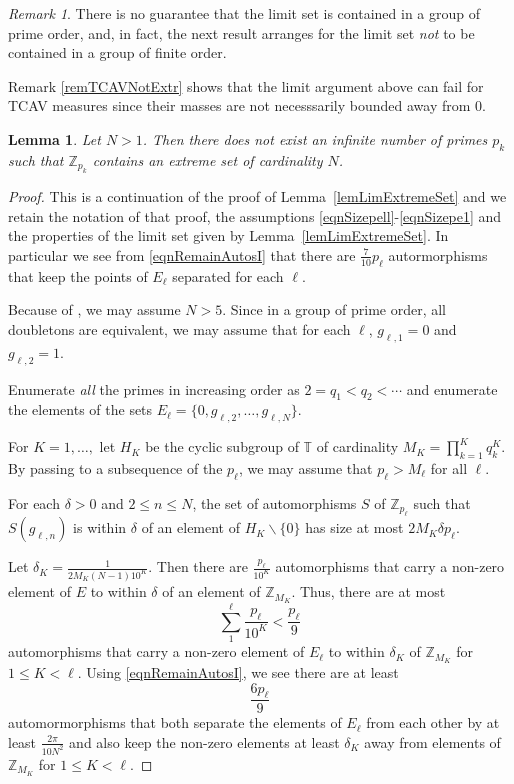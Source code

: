 \documentclass[letter,11pt]{amsart}
\numberwithin{theorem}{section}
\newtheorem{lem}[theorem]{Lemma}
\theoremstyle{remark}
\newtheorem{rem}[theorem]{Remark}
\numberwithin{equation}{section}
\newcommand{\lemref}[1]{Lemma~\ref{#1}}
\newcommand{\remref}[1]{Remark \ref{#1}}
\newcommand\Zp[2]{\texttt{$\mathbb Z_{#1}^{\	#2}$}}
\begin{document}
\begin{rem} There is no guarantee that the limit set is contained in a group of prime order, and, in fact, the next result arranges for the limit set \emph{not}
to be contained in a group of finite order.

\remref{remTCAVNotExtr} shows that the limit argument above can fail
 for TCAV measures since their masses are not necesssarily bounded away from 0.
 \end{rem}
 
\begin{lem}\label{lemLimExtremeSetII}  Let $N>1$. Then there does not exist an 
infinite number of primes $p_k$ such that  \Zp {p_k}{} contains
an extreme set
of cardinality $N$.
\end{lem}

\begin{proof} This is a continuation of the proof of \lemref{lemLimExtremeSet} and we retain the notation of that proof, the assumptions \eqref{eqnSizepell}-\eqref{eqnSizepe1} and 
the properties of the limit set given by \lemref{lemLimExtremeSet}.
In particular we see  from \eqref{eqnRemainAutosI} that there are $\frac{7}{10}p_\ell$ autormorphisms that
keep the points of $E_\ell$ separated for each $\ell$.

Because of \cite[3.1-3.3 and 3.4 (ii)]{MR627683}, we may assume $N>5$.
Since in a group of prime order, all doubletons are equivalent, we
 may assume that for each $\ell$, $g_{\ell,1} = 0$ and $g_{\ell,2} = 1$.

Enumerate \emph{all} the primes in increasing order as $2=q_1<q_2<\cdots$ and enumerate
the elements of the sets $E_\ell=\{0, g_{\ell,2}, \dots, g_{\ell, N}\}$.

For $K=1,\dots,$ let $H_K$ be the cyclic subgroup of $\mathbb T$ of cardinality $M_K =\prod_{k=1}^K q_k^K$.
 By passing to a subsequence of the $p_\ell$, we may assume
that $p_\ell > M_\ell$ for all $\ell$.

For each $\delta>0$ and $2\le n \le  N$,  
 the set of automorphisms $S$ of \Zp{p_\ell}{} 
such that $S(g_{\ell, n})$ is within $\delta$ of an element of $H_K\backslash \{0\}$
 has size at most $2M_K\delta p_{\ell}$.

Let $\delta_K = \frac{1}{2M_K (N-1) 10^K}$. Then there are
$\frac{p_\ell}{10^K}$
automorphisms that carry a non-zero  element of $E$   to within 
$\delta$ of an element of \Zp{M_K}{}.
Thus, there are at most 
\begin{equation}\label{eqCountAutos}
\sum_1^\ell \frac{p_\ell}{10^K}<\frac{p_\ell}{9}
\end{equation}
automorphisms that carry a non-zero element of $E_\ell$ to within $\delta_K$ of \Zp{M_K}{}
for $1\le K<\ell$.
Using \eqref{eqnRemainAutosI}, we see there are at least 
\begin{equation}\label{eqCountAutos2}
\frac{6p_\ell}{9}
\end{equation}
 automormorphisms that  both separate the
elements of $E_\ell$ from each other by at least $\frac{2\pi}{10N^2}$ and also 
keep the non-zero elements
at least $\delta_K$ away from elements of \Zp{M_K}{} for $1\le K<\ell.$


\end{proof}
\end{document}
